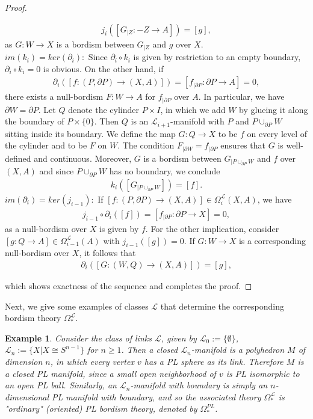 \documentclass{scrreprt}
\newtheorem{example}[prop]{Example}
\begin{document}
\begin{proof}
\begin{itemize}
\begin{align*}
j_i([G_{|Z}: -Z \to A]) = [g],
\end{align*}
as $G: W \to X$ is a bordism between $G_{|Z}$ and $g$ over $X$. \\
$im(k_i)=ker(\partial_i):$ Since $\partial_i \circ k_i$ is given by restriction to an empty boundary, $\partial_i \circ k_i=0$ is obvious. On the other hand, if 
\begin{align*}
\partial_i([f:(P, \partial P) \to (X,A)])= [f_{| \partial P} : \partial P \to A] = 0,
\end{align*}
there exists a null-bordism $F: W \to A$ for $f_{| \partial P}$ over $A$. In particular, we have $\partial W= \partial P$. Let $Q$ denote the cylinder $P \times I$, in which we add $W$ by glueing it along the boundary of $P \times \{ 0 \}$. Then $Q$ is an $\mathcal{L}_{i+1}$-manifold with $P$ and $P \cup_{\partial P} W$ sitting inside its boundary. We define the map $G: Q \to X$ to be $f$ on every level of the cylinder and to be $F$ on $W$. The condition $F_{| \partial W}=f_{| \partial P}$ ensures that $G$ is well-defined and continuous. Moreover, $G$ is a bordism between $G_{|P \cup_{\partial P} W}$ and $f$ over $(X,A)$ and since $P \cup_{\partial P} W$ has no boundary, we conclude 
\begin{align*}
k_i([G_{|P \cup_{\partial P} W}])=[f].
\end{align*}
$im(\partial_i)= ker(j_{i-1}):$ If $[f:(P, \partial P) \to (X,A)] \in \Omega_{i}^{\mathcal{L}}(X,A)$, we have 
\begin{align*}
j_{i-1} \circ \partial_i ([f])= [f_{| \partial P}: \partial P \to X] = 0,
\end{align*}
as a null-bordism over $X$ is given by $f$. For the other implication, consider $[g: Q \to A] \in \Omega_{i-1}^{\mathcal{L}}(A)$ with $j_{i-1}([g])=0$. If $G: W \to X$ is a corresponding null-bordism over $X$, it follows that
\begin{align*}
\partial_i([G: (W,Q) \to (X,A)]) = [g],
\end{align*}
\end{itemize}
which shows exactness of the sequence and completes the proof.
\end{proof}

Next, we give some examples of classes $\mathcal{L}$ that determine the corresponding bordism theory $\Omega_*^{\mathcal{L}}$.

\begin{example}
Consider the class of links $\mathcal{L}$, given by $\mathcal{L}_0 := \{ \emptyset \}$, $\mathcal{L}_n:= \{ X | X \cong S^{n-1} \}$ for $n \geq 1$. Then a closed $\mathcal{L}_n$-manifold is a polyhedron $M$ of dimension $n$, in which every vertex $v$ has a PL sphere as its link. Therefore $M$ is a closed PL manifold, since a small open neighborhood of $v$ is PL isomorphic to an open PL ball. Similarly, an $\mathcal{L}_n$-manifold with boundary is simply an $n$-dimensional PL manifold with boundary, and so the associated theory $\Omega_*^{\mathcal{L}}$ is "ordinary" (oriented) PL bordism theory, denoted by $\Omega_*^{PL}$.
\end{example}
\end{document}

